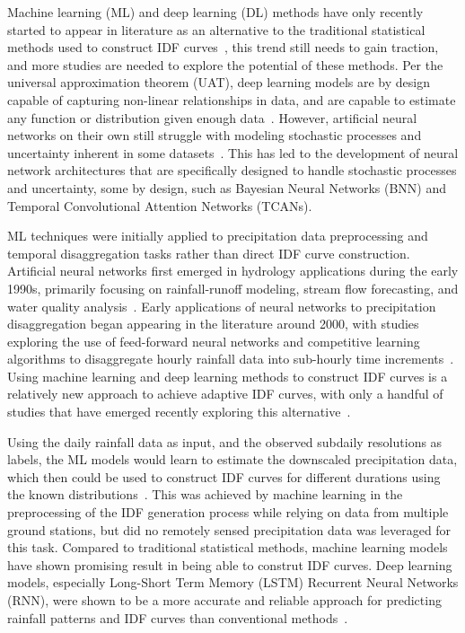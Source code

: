 Machine learning (ML) and deep learning (DL) methods have only recently started to appear in literature as an alternative to the traditional statistical methods used to construct IDF curves~\cite{idfkoya}, this trend still needs to gain traction, and more studies are needed to explore the potential of these methods. Per the universal approximation theorem (UAT), deep learning models are by design capable of capturing non-linear relationships in data, and are capable to estimate any function or distribution given enough data~\cite{Goodfellow2016-sect6.4.1}. However, artificial neural networks on their own still struggle with modeling stochastic processes and uncertainty inherent in some datasets~\cite{thacker2020fundamentalissuesregardinguncertainties}. This has led to the development of neural network architectures that are specifically designed to handle stochastic processes and uncertainty, some by design, such as Bayesian Neural Networks (BNN) and Temporal Convolutional Attention Networks (TCANs).~\cite{lin2021tcan, goan2020} 

\vspace{1em}

ML techniques were initially applied to precipitation data preprocessing and temporal disaggregation tasks rather than direct IDF curve construction. Artificial neural networks first emerged in hydrology applications during the early 1990s, primarily focusing on rainfall-runoff modeling, stream flow forecasting, and water quality analysis~\cite{doi:10.1061}. Early applications of neural networks to precipitation disaggregation began appearing in the literature around 2000, with studies exploring the use of feed-forward neural networks and competitive learning algorithms to disaggregate hourly rainfall data into sub-hourly time increments~\cite{doi:10.1061}. Using machine learning and deep learning methods to construct IDF curves is a relatively new approach to achieve adaptive IDF curves, with only a handful of studies that have emerged recently exploring this alternative~\cite{idfkoya}.

\vspace{1em}

Using the daily rainfall data as input, and the observed subdaily resolutions as labels, the ML models would learn to estimate the downscaled precipitation data, which then could be used to construct IDF curves for different durations using the known distributions~\cite{geosciences9050209}. This was achieved by machine learning in the preprocessing of the IDF generation process while relying on data from multiple ground stations, but did no remotely sensed precipitation data was leveraged for this task. Compared to traditional statistical methods, machine learning models have shown promising result in being able to construt IDF curves. Deep learning models, especially Long-Short Term Memory (LSTM) Recurrent Neural Networks (RNN), were shown to be a more accurate and reliable approach for predicting rainfall patterns and IDF curves than conventional methods~\cite{idfkoya}.